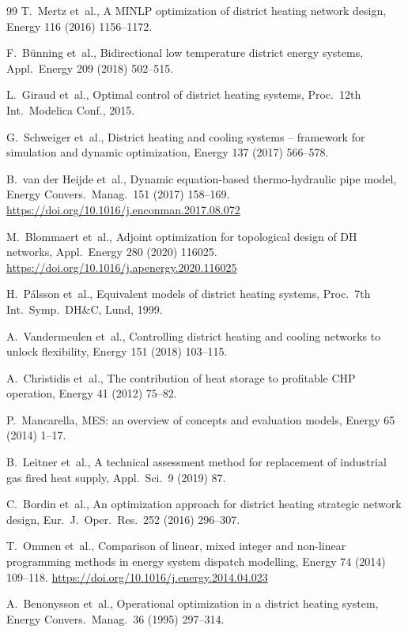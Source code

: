 \documentclass[review,3p]{elsarticle}
\begin{document}
\begin{thebibliography}{99}
T.~Mertz et~al.,
A MINLP optimization of district heating network design,
Energy 116 (2016) 1156--1172.

F.~B\"{u}nning et~al.,
Bidirectional low temperature district energy systems,
Appl.\ Energy 209 (2018) 502--515.

L.~Giraud et~al.,
Optimal control of district heating systems,
Proc.\ 12th Int.\ Modelica Conf., 2015.

G.~Schweiger et~al.,
District heating and cooling systems -- framework for simulation and
dynamic optimization,
Energy 137 (2017) 566--578.

B.~van der Heijde et~al.,
Dynamic equation-based thermo-hydraulic pipe model,
Energy Convers.\ Manag.\ 151 (2017) 158--169.
\url{https://doi.org/10.1016/j.enconman.2017.08.072}

M.~Blommaert et~al.,
Adjoint optimization for topological design of DH networks,
Appl.\ Energy 280 (2020) 116025.
\url{https://doi.org/10.1016/j.apenergy.2020.116025}

H.~P\'{a}lsson et~al.,
Equivalent models of district heating systems,
Proc.\ 7th Int.\ Symp.\ DH\&C, Lund, 1999.

A.~Vandermeulen et~al.,
Controlling district heating and cooling networks to unlock
flexibility,
Energy 151 (2018) 103--115.

A.~Christidis et~al.,
The contribution of heat storage to profitable CHP operation,
Energy 41 (2012) 75--82.

P.~Mancarella,
MES: an overview of concepts and evaluation models,
Energy 65 (2014) 1--17.

B.~Leitner et~al.,
A technical assessment method for replacement of industrial gas fired
heat supply,
Appl.\ Sci.\ 9 (2019) 87.

C.~Bordin et~al.,
An optimization approach for district heating strategic network
design,
Eur.\ J.\ Oper.\ Res.\ 252 (2016) 296--307.

T.~Ommen et~al.,
Comparison of linear, mixed integer and non-linear programming
methods in energy system dispatch modelling,
Energy 74 (2014) 109--118.
\url{https://doi.org/10.1016/j.energy.2014.04.023}

A.~Benonysson et~al.,
Operational optimization in a district heating system,
Energy Convers.\ Manag.\ 36 (1995) 297--314.


\end{thebibliography}
\end{document}
